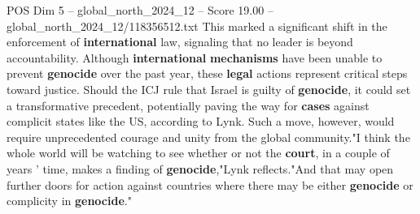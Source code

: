 \begin{textsample}{POS Dim 5 – global\_north\_2024\_12 – Score 19.00 – global\_north\_2024\_12/118356512.txt}
This marked a significant shift in the enforcement of \textbf{international} law, signaling that no leader is beyond accountability.
Although \textbf{international} \textbf{mechanisms} have been unable to prevent \textbf{genocide} over the past year, these \textbf{legal} actions represent critical steps toward justice.
Should the ICJ rule that Israel is guilty of \textbf{genocide}, it could set a transformative precedent, potentially paving the way for \textbf{cases} against complicit states like the US, according to Lynk.
Such a move, however, would require unprecedented courage and unity from the global community."I think the whole world will be watching to see whether or not the \textbf{court}, in a couple of years ' time, makes a finding of \textbf{genocide},"Lynk reflects."And that may open further doors for action against countries where there may be either \textbf{genocide} or complicity in \textbf{genocide}."

\end{textsample}
